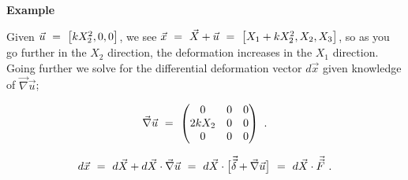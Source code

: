 \documentclass{article}
\begin{document}
\textbf{Example}

Given \begin{math} \vec{u} \hspace{0.125cm} = \hspace{0.125cm} \big[ k X_{2}^{2} , 0 , 0 \big]  \end{math}, we see \begin{math} \vec{x} \hspace{0.125cm} = \hspace{0.125cm} \vec{X} + \vec{u}  \hspace{0.125cm} = \hspace{0.125cm} \big[ X_1 + k X_{2}^{2} , X_2 , X_3 \big]  \end{math}, so as you go further in the \begin{math} X_2  \end{math} direction, the deformation increases in the \begin{math} X_1 \end{math} direction. Going further we solve for the differential deformation vector \begin{math} d \vec{x} \end{math} given knowledge of \begin{math} \vec{\nabla} \vec{u} \end{math}; 

\begin{equation} \label{eb-eq-1-73}
\vec{\nabla} \vec{u}  \hspace{0.125cm} =  \hspace{0.125cm}  \begin{pmatrix} 0 & 0 & 0 \\ 2 k X_2 & 0 & 0 \\ 0 & 0 & 0 \end{pmatrix}  \hspace{0.125cm} .
\end{equation} 

\begin{equation} \label{eb-eq-1-74}
d \vec{x} \hspace{0.125cm} = \hspace{0.125cm} d \vec{X} + d \vec{X} \cdot \vec{\nabla} \vec{u}  \hspace{0.125cm} = \hspace{0.125cm} d \vec{X} \cdot \big[ \vec{\vec{\delta}} + \vec{\nabla} \vec{u} \big]  \hspace{0.125cm} = \hspace{0.125cm} d  \vec{X} \cdot \vec{\vec{F}} \hspace{0.125cm} .
\end{equation} 
\end{document}
